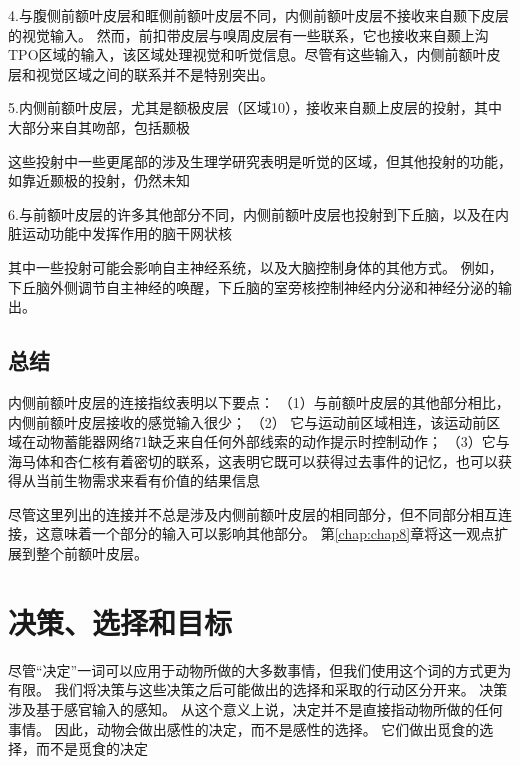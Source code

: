 4.与腹侧前额叶皮层和眶侧前额叶皮层不同，内侧前额叶皮层不接收来自颞下皮层的视觉输入\cite{carmichael1995sensory,kondo2005differential}。
然而，前扣带皮层与嗅周皮层有一些联系，它也接收来自颞上沟TPO区域的输入\cite{kondo2005differential}，该区域处理视觉和听觉信息。尽管有这些输入，内侧前额叶皮层和视觉区域之间的联系并不是特别突出。\par


5.内侧前额叶皮层，尤其是额极皮层（区域10），接收来自颞上皮层的投射，其中大部分来自其吻部，包括颞极\cite{barbas1999medial,kondo2003differential}\par
这些投射中一些更尾部的涉及生理学研究表明是听觉的区域\cite{hackett1998subdivisions}，但其他投射的功能，如靠近颞极的投射，仍然未知\par


6.与前额叶皮层的许多其他部分不同，内侧前额叶皮层也投射到下丘脑\cite{rempel1998topographic}，以及在内脏运动功能中发挥作用的脑干网状核\cite{ongur1998prefrontal}\par


其中一些投射可能会影响自主神经系统，以及大脑控制身体的其他方式。
例如，下丘脑外侧调节自主神经的唤醒，下丘脑的室旁核控制神经内分泌和神经分泌的输出。\par



\subsection{总结}

内侧前额叶皮层的连接指纹表明以下要点：
（1）与前额叶皮层的其他部分相比，内侧前额叶皮层接收的感觉输入很少；
（2） 它与运动前区域相连，该运动前区域在动物蓄能器网络71缺乏来自任何外部线索的动作提示时控制动作；
（3）它与海马体和杏仁核有着密切的联系，这表明它既可以获得过去事件的记忆，也可以获得从当前生物需求来看有价值的结果信息\par


尽管这里列出的连接并不总是涉及内侧前额叶皮层的相同部分，但不同部分相互连接\cite{barbas2000connections}，这意味着一个部分的输入可以影响其他部分。
第\ref{chap:chap8}章将这一观点扩展到整个前额叶皮层。\par



\section{决策、选择和目标}

尽管“决定”一词可以应用于动物所做的大多数事情，但我们使用这个词的方式更为有限。
我们将决策与这些决策之后可能做出的选择和采取的行动区分开来\cite{schall2001neural}。
决策涉及基于感官输入的感知。
从这个意义上说，决定并不是直接指动物所做的任何事情。
因此，动物会做出感性的决定，而不是感性的选择。
它们做出觅食的选择，而不是觅食的决定\par


